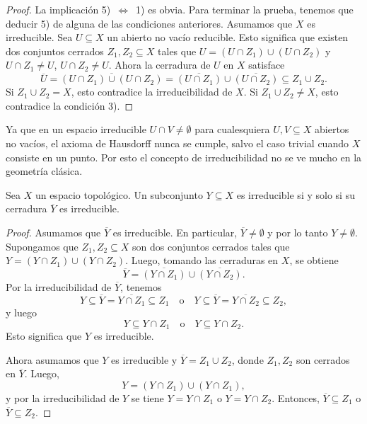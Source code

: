 \documentclass{article}
\numberwithin{equation}{section}
\theoremstyle{definition}
\begin{document}
\begin{proposicion}
\begin{proof}
    La implicación 5)~$\Leftrightarrow$~1) es obvia. Para terminar la prueba,
    tenemos que deducir 5) de alguna de las condiciones anteriores. Asumamos que
    $X$ es irreducible. Sea $U \subseteq X$ un abierto no vacío reducible. Esto
    significa que existen dos conjuntos cerrados $Z_1, Z_2 \subseteq X$ tales
    que $U = (U\cap Z_1) \cup (U\cap Z_2)$ y $U\cap Z_1 \ne U$,
    $U\cap Z_2 \ne U$. Ahora la cerradura de $U$ en $X$ satisface
    \[ \overline{U} =
       \overline{(U\cap Z_1) \cup (U\cap Z_2)} =
       \overline{(U\cap Z_1)} \cup \overline{(U\cap Z_2)}
       \subseteq Z_1 \cup Z_2. \]
    Si $Z_1 \cup Z_2 = X$, esto contradice la irreducibilidad de $X$.
    Si $Z_1\cup Z_2 \ne X$, esto contradice la condición 3).
  \end{proof}
\end{proposicion}

\begin{comentario}
  Ya que en un espacio irreducible $U \cap V \ne \emptyset$ para cualesquiera
  $U,V \subseteq X$ abiertos no vacíos, el axioma de Hausdorff nunca se cumple,
  salvo el caso trivial cuando $X$ consiste en un punto. Por esto el concepto
  de irreducibilidad no se ve mucho en la geometría clásica.
\end{comentario}

\begin{proposicion}
  Sea $X$ un espacio topológico. Un subconjunto $Y \subseteq X$ es irreducible
  si y solo si su cerradura $\overline{Y}$ es irreducible.

  \begin{proof}
    Asumamos que $\overline{Y}$ es irreducible. En particular,
    $\overline{Y} \ne \emptyset$ y por lo tanto $Y \ne \emptyset$. Supongamos
    que $Z_1, Z_2 \subseteq X$ son dos conjuntos cerrados tales que
    $Y = (Y\cap Z_1) \cup (Y\cap Z_2)$. Luego, tomando las cerraduras en $X$,
    se obtiene
    $$\overline{Y} = \overline{(Y\cap Z_1)} \cup \overline{(Y\cap Z_2)}.$$
    Por la irreducibilidad de $\overline{Y}$, tenemos
    \[ Y \subseteq \overline{Y} = \overline{Y\cap Z_1} \subseteq Z_1
       \quad\text{o}\quad
       Y \subseteq \overline{Y} = \overline{Y\cap Z_2} \subseteq Z_2, \]
    y luego
    $$Y \subseteq Y\cap Z_1\quad\text{o}\quad Y \subseteq Y\cap Z_2.$$
    Esto significa que $Y$ es irreducible.

    Ahora asumamos que $Y$ es irreducible y $\overline{Y} = Z_1 \cup Z_2$, donde
    $Z_1, Z_2$ son cerrados en $\overline{Y}$. Luego,
    $$Y = (Y\cap Z_1) \cup (Y\cap Z_1),$$
    y por la irreducibilidad de $Y$ se tiene $Y = Y\cap Z_1$ o
    $Y = Y\cap Z_2$. Entonces, $\overline{Y} \subseteq Z_1$ o
    $\overline{Y} \subseteq Z_2$.
  \end{proof}
\end{proposicion}
\end{document}
